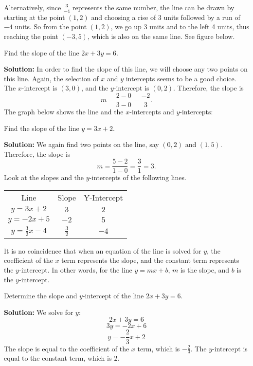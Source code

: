 
Alternatively, since $\frac{3}{-4}$ represents the same number, the line can be drawn by starting at the point $(1, 2)$ and choosing a rise of 3 units followed by a run of $-4$ units. So from the point $(1, 2)$, we go up 3 units and to the left 4 units, thus reaching the point $(-3, 5)$, which is also on the same line. See figure below.


\begin{example}
Find the slope of the line $2x + 3y = 6$.	
\end{example}

\textbf{Solution:} In order to find the slope of this line, we will choose any two points on this line.
Again, the selection of $x$ and $y$ intercepts seems to be a good choice. The $x$-intercept is $(3, 0)$, and the $y$-intercept is $(0, 2)$. Therefore, the slope is
\[ m = \frac{2 - 0}{3 - 0} = \frac{-2}{3} .\]
The graph below shows the line and the $x$-intercepts and $y$-intercepts: 


\begin{example}
Find the slope of the line $y = 3x + 2$.
\end{example}

\textbf{Solution:} We again find two points on the line, say $(0, 2)$ and $(1, 5)$.
Therefore, the slope is
\[ m = \frac{5 - 2}{1 - 0} = \frac{3}{1} = 3.\]
Look at the slopes and the $y$-intercepts of the following lines.
\begin{center}

\begin{tabular}{ccc}
Line & Slope & Y-Intercept \\
$y = 3x + 2$ & $3$ & $2$ \\
$y = -2x + 5$ & $-2$ & $5$ \\
$y = \frac{3}{2}x - 4$ & $\frac{3}{2}$ & $-4$
\end{tabular}
\end{center}

It is no coincidence that when an equation of the line is solved for $y$, the coefficient of the $x$ term represents the slope, and the constant term represents the $y$-intercept.
In other words, for the line $y = mx + b$, $m$ is the slope, and $b$ is the $y$-intercept.

\begin{example}
Determine the slope and $y$-intercept of the line $2x + 3y = 6$.
\end{example}

\textbf{Solution:} We solve for $y$:
\[2x + 3y = 6\]
\[3y = -2x + 6\]
\[y = -\frac{2}{3}x + 2\]
The slope is equal to the coefficient of the $x$ term, which is $-\frac{2}{3}$.
The $y$-intercept is equal to the constant term, which is $2$.
